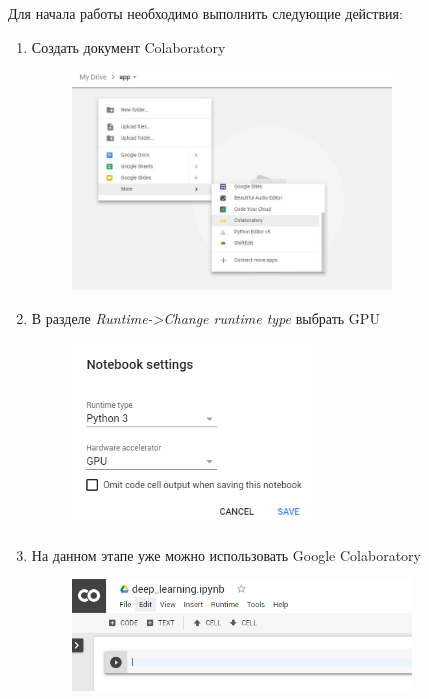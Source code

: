 Для начала работы необходимо выполнить следующие действия:
\begin{enumerate}\label{alg:colab_settings}
\item Создать документ Colaboratory
\begin{figure}[h]
    \centering
    \includegraphics[width=0.8\textwidth]{colab_settings_1.jpeg}
    \label{fig:colab_settings_1}
\end{figure}

\item В разделе \textsl{Runtime->Change runtime type} выбрать GPU
\begin{figure}[h]
    \centering
    \includegraphics[width=0.6\textwidth]{colab_settings_2.png}
    \label{fig:colab_settings_2}
\end{figure}

\item На данном этапе уже можно использовать Google Colaboratory
\begin{figure}[h]
    \centering
    \includegraphics[width=0.85\textwidth]{colab_settings_3.png}
    \label{fig:colab_settings_3}
\end{figure}


\end{enumerate}

